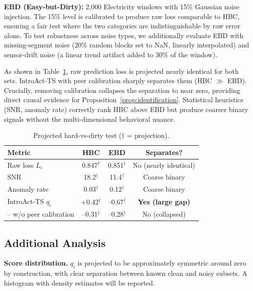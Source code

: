 \documentclass{article}
\begin{document}
\textbf{EBD (Easy-but-Dirty):} 2,000 Electricity windows with 15\% Gaussian noise injection. The 15\% level is calibrated to produce raw loss comparable to HBC, ensuring a fair test where the two categories are indistinguishable by raw error alone. To test robustness across noise types, we additionally evaluate EBD with missing-segment noise (20\% random blocks set to NaN, linearly interpolated) and sensor-drift noise (a linear trend artifact added to 30\% of the window).

As shown in Table~\ref{tab:hard_vs_dirty}, raw prediction loss is projected nearly identical for both sets. IntroAct-TS with peer calibration sharply separates them (HBC $\gg$ EBD). Crucially, removing calibration collapses the separation to near zero, providing direct causal evidence for Proposition~\ref{prop:identification}. Statistical heuristics (SNR, anomaly rate) correctly rank HBC above EBD but produce coarser binary signals without the multi-dimensional behavioral nuance.

\begin{table}[t]
\centering
\caption{Projected hard-vs-dirty test ($\dagger$ = projection).}
\label{tab:hard_vs_dirty}
\begin{tabular}{lccc}
\toprule
\textbf{Metric} & \textbf{HBC} & \textbf{EBD} & \textbf{Separates?} \\
\midrule
Raw loss $L_i$ & 0.847$^\dagger$ & 0.851$^\dagger$ & No (nearly identical) \\
SNR & 18.2$^\dagger$ & 11.4$^\dagger$ & Coarse binary \\
Anomaly rate & 0.03$^\dagger$ & 0.12$^\dagger$ & Coarse binary \\
IntroAct-TS $q_i$ & +0.42$^\dagger$ & --0.67$^\dagger$ & \textbf{Yes (large gap)} \\
-- w/o peer calibration & --0.31$^\dagger$ & --0.28$^\dagger$ & No (collapsed) \\
\bottomrule
\end{tabular}
\end{table}

\subsection{Additional Analysis}

\textbf{Score distribution.} $q_i$ is projected to be approximately symmetric around zero by construction, with clear separation between known clean and noisy subsets. A histogram with density estimates will be reported.
\end{document}
